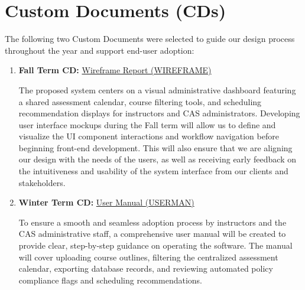 \documentclass{article}
\begin{document}
\section{Custom Documents (CDs)}

The following two Custom Documents were selected to guide our design process
throughout the year and support end-user adoption:

\begin{enumerate}
    \item \textbf{Fall Term CD:} \href{https://github.com/smiths/capTemplate/tree/main/docs/CDs/Wireframe}{Wireframe Report (WIREFRAME)}
    

    The proposed system centers on a visual administrative dashboard featuring
    a shared assessment calendar, course filtering tools, and scheduling recommendation
    displays for instructors and CAS administrators. Developing user interface mockups during the
    Fall term will allow us to define and visualize the UI component interactions and workflow navigation
    before beginning front-end development. This will also ensure that we are aligning our design with the needs of the users, 
    as well as receiving early feedback on the intuitiveness and usability of the system interface from our clients and stakeholders.

    \item \textbf{Winter Term CD:} \href{https://github.com/smiths/capTemplate/tree/main/docs/CDs/UserManual}{User Manual (USERMAN)}
    
    
    To ensure a smooth and seamless adoption process by instructors and the CAS administrative staff, 
    a comprehensive user manual will be created to provide clear, step-by-step guidance on operating the software. 
    The manual will cover uploading course outlines, filtering the centralized assessment calendar, 
    exporting database records, and reviewing automated policy compliance flags and scheduling recommendations.
\end{enumerate}
\end{document}
